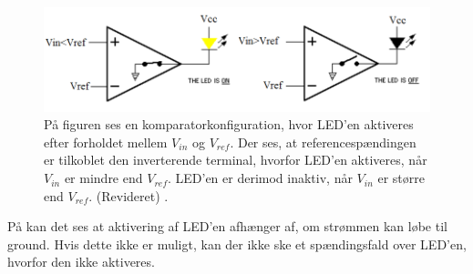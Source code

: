 \begin{figure}[H] 
	\centering
	\includegraphics[scale=0.9]{figures/cProblemloesning/komparator_forstaeelse.PNG}
	\caption{På figuren ses en komparatorkonfiguration, hvor LED'en aktiveres efter forholdet mellem $V_{in}$ og $V_{ref}$. Der ses, at referencespændingen er tilkoblet den inverterende terminal, hvorfor LED'en aktiveres, når $V_{in}$ er mindre end $V_{ref}$. LED'en er derimod inaktiv, når $V_{in}$ er større end $V_{ref}$. (Revideret) \cite{Paisley2015}.}
	\label{fig:komparator_forstaeelse}
\end{figure}
\noindent På  kan det ses at aktivering af LED'en afhænger af, om strømmen kan løbe til ground. Hvis dette ikke er muligt, kan der ikke ske et spændingsfald over LED'en, hvorfor den ikke aktiveres. %

